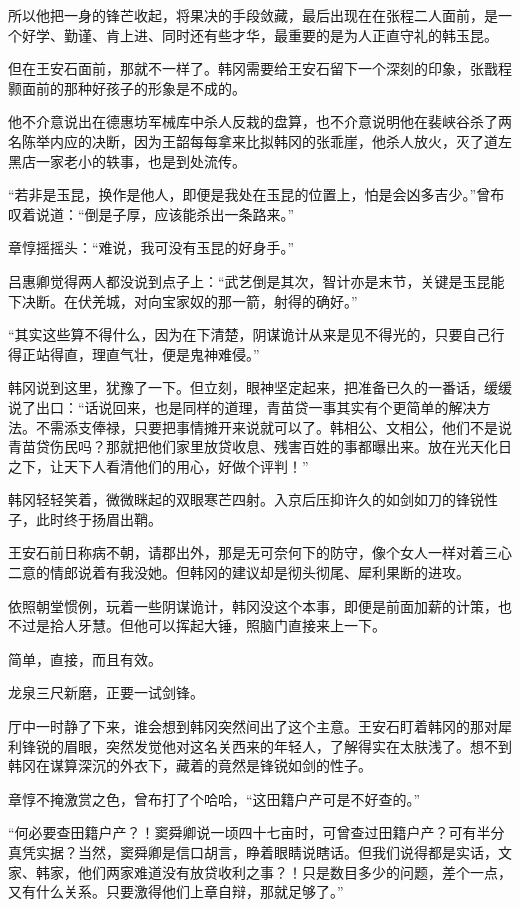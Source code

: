 所以他把一身的锋芒收起，将果决的手段敛藏，最后出现在在张程二人面前，是一个好学、勤谨、肯上进、同时还有些才华，最重要的是为人正直守礼的韩玉昆。

但在王安石面前，那就不一样了。韩冈需要给王安石留下一个深刻的印象，张戬程颢面前的那种好孩子的形象是不成的。

他不介意说出在德惠坊军械库中杀人反栽的盘算，也不介意说明他在裴峡谷杀了两名陈举内应的决断，因为王韶每每拿来比拟韩冈的张乖崖，他杀人放火，灭了道左黑店一家老小的轶事，也是到处流传。

“若非是玉昆，换作是他人，即便是我处在玉昆的位置上，怕是会凶多吉少。”曾布叹着说道：“倒是子厚，应该能杀出一条路来。”

章惇摇摇头：“难说，我可没有玉昆的好身手。”

吕惠卿觉得两人都没说到点子上：“武艺倒是其次，智计亦是末节，关键是玉昆能下决断。在伏羌城，对向宝家奴的那一箭，射得的确好。”

“其实这些算不得什么，因为在下清楚，阴谋诡计从来是见不得光的，只要自己行得正站得直，理直气壮，便是鬼神难侵。”

韩冈说到这里，犹豫了一下。但立刻，眼神坚定起来，把准备已久的一番话，缓缓说了出口：“话说回来，也是同样的道理，青苗贷一事其实有个更简单的解决方法。不需添支俸禄，只要把事情摊开来说就可以了。韩相公、文相公，他们不是说青苗贷伤民吗？那就把他们家里放贷收息、残害百姓的事都曝出来。放在光天化日之下，让天下人看清他们的用心，好做个评判！”

韩冈轻轻笑着，微微眯起的双眼寒芒四射。入京后压抑许久的如剑如刀的锋锐性子，此时终于扬眉出鞘。

王安石前日称病不朝，请郡出外，那是无可奈何下的防守，像个女人一样对着三心二意的情郎说着有我没她。但韩冈的建议却是彻头彻尾、犀利果断的进攻。

依照朝堂惯例，玩着一些阴谋诡计，韩冈没这个本事，即便是前面加薪的计策，也不过是拾人牙慧。但他可以挥起大锤，照脑门直接来上一下。

简单，直接，而且有效。

龙泉三尺新磨，正要一试剑锋。

厅中一时静了下来，谁会想到韩冈突然间出了这个主意。王安石盯着韩冈的那对犀利锋锐的眉眼，突然发觉他对这名关西来的年轻人，了解得实在太肤浅了。想不到韩冈在谋算深沉的外衣下，藏着的竟然是锋锐如剑的性子。

章惇不掩激赏之色，曾布打了个哈哈，“这田籍户产可是不好查的。”

“何必要查田籍户产？！窦舜卿说一顷四十七亩时，可曾查过田籍户产？可有半分真凭实据？当然，窦舜卿是信口胡言，睁着眼睛说瞎话。但我们说得都是实话，文家、韩家，他们两家难道没有放贷收利之事？！只是数目多少的问题，差个一点，又有什么关系。只要激得他们上章自辩，那就足够了。”

